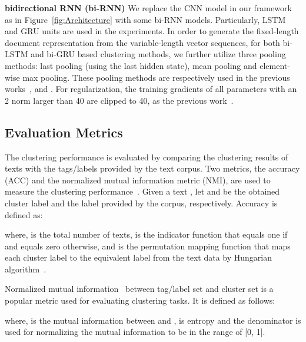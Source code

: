 \documentclass[review]{elsarticle}
\begin{document}
{\bf{bidirectional RNN (bi-RNN)}} We replace the CNN model in our framework as in Figure~\ref{fig:Architecture} with some bi-RNN models. Particularly, LSTM and GRU units are used in the experiments. In order to generate the fixed-length document representation from the variable-length vector sequences, for both bi-LSTM and bi-GRU based clustering methods, we further utilize three pooling methods:  last pooling (using the last hidden state), mean pooling and element-wise max pooling. These pooling methods are respectively used in the previous works~\cite{palangi2015deep,cho2014learning}, \cite{tang2015document} and \cite{14_lai2015rcnn}. For regularization, the training gradients of all parameters with an 2 norm larger than 40 are clipped to 40, as the previous work~\cite{sukhbaatar2015end}.


\subsection{Evaluation Metrics}
The clustering performance is evaluated by comparing the clustering results of texts with the tags/labels provided by the text corpus. Two metrics, the accuracy (ACC) and the normalized mutual information metric (NMI), are used to measure the clustering performance~\cite{4_cai2005document,1_huang2014deep}. Given a text , let  and  be the obtained cluster label and the label provided by the corpus, respectively.
Accuracy is defined as:

where,  is the total number of texts,  is the indicator function that equals one if  and equals zero otherwise, and  is the permutation mapping function that maps each cluster label  to the equivalent label from the text data by Hungarian algorithm~\cite{7_papadimitriou1998combinatorial}.

Normalized mutual information~\cite{8_chen2011parallel} between tag/label set  and cluster set  is a popular metric used for evaluating clustering tasks. It is defined as follows:

where,  is the mutual information between  and ,  is entropy and the denominator  is used for normalizing the mutual information to be in the range of [0, 1].
\end{document}
